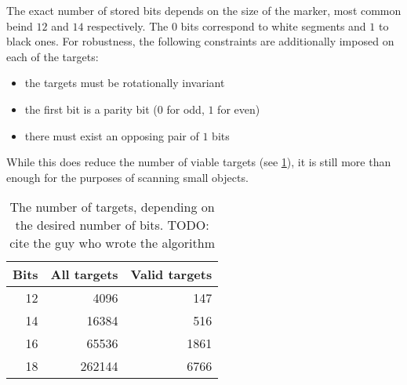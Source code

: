 The exact number of stored bits depends on the size of the marker, most common beind $12$ and $14$ respectively.
The $0$ bits correspond to white segments and $1$ to black ones.
For robustness, the following constraints are additionally imposed on each of the targets:

\begin{itemize}
	\item the targets must be rotationally invariant
	\item the first bit is a parity bit ($0$ for odd, $1$ for even)
	\item there must exist an opposing pair of $1$ bits
\end{itemize}

While this does reduce the number of viable targets (see \cref{tab:markers}), it is still more than enough for the purposes of scanning small objects.

\begin{table}
\centering\footnotesize\sf
\begin{tabular}{rrr}
\toprule
Bits & All targets & Valid targets \\
\midrule
12 & 4096   & 147 \\
14 & 16384  & 516 \\
16 & 65536  & 1861 \\
18 & 262144 & 6766 \\
\bottomrule
\end{tabular}
\caption{The number of targets, depending on the desired number of bits. TODO: cite the guy who wrote the algorithm}
\label{tab:markers}
\end{table}
